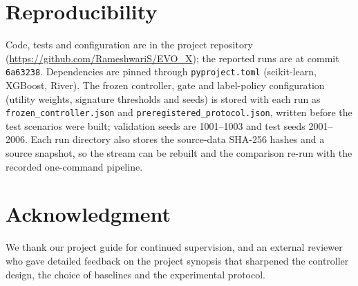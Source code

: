 \documentclass[conference]{IEEEtran}
\begin{document}
\section*{Reproducibility}
Code, tests and configuration are in the project repository (\url{https://github.com/RameshwariS/EVO_X}); the reported runs are at commit \texttt{6a63238}. Dependencies are pinned through \texttt{pyproject.toml} (scikit-learn, XGBoost, River). The frozen controller, gate and label-policy configuration (utility weights, signature thresholds and seeds) is stored with each run as \texttt{frozen\_controller.json} and \texttt{preregistered\_protocol.json}, written before the test scenarios were built; validation seeds are 1001--1003 and test seeds 2001--2006. Each run directory also stores the source-data SHA-256 hashes and a source snapshot, so the stream can be rebuilt and the comparison re-run with the recorded one-command pipeline.

\section*{Acknowledgment}
We thank our project guide for continued supervision, and an external reviewer who gave detailed feedback on the project synopsis that sharpened the controller design, the choice of baselines and the experimental protocol.



\end{document}
